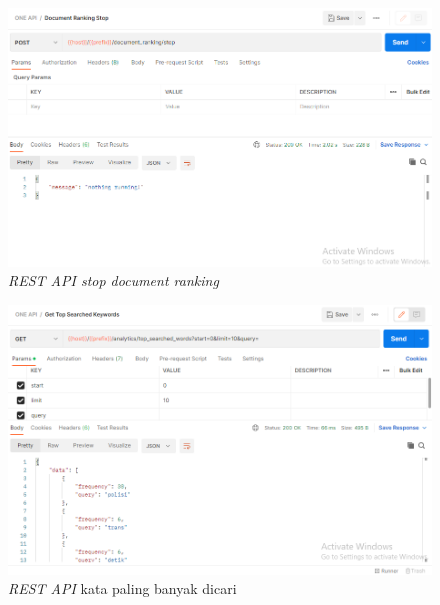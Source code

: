 \begin{enumerate}[label=\alph*)., leftmargin=1\parindent]
	
	\begin{figure}[H]
		\centering
		\includegraphics[keepaspectratio, width=13cm]{gambar/rest_document_ranking_stop.png}
		\caption{\textit{REST API stop document ranking} }
		\label{gambar:rest_document_ranking_stop.png}
	\end{figure}
	
	
	\begin{figure}[H]
		\centering
		\includegraphics[keepaspectratio, width=13cm]{gambar/rest_top_searched_words.png}
		\caption{\textit{REST API} kata paling banyak dicari}
		\label{gambar:rest_top_searched_words.png}
	\end{figure}
	

\end{enumerate}
